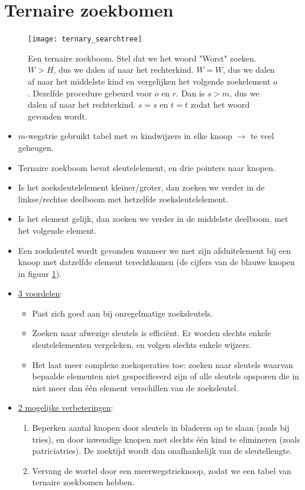 \documentclass{report}
\begin{document}
\section{Ternaire zoekbomen}
\begin{figure}
	\centering
	\texttt{[image: ternary\_searchtree]}
	\caption{Een ternaire zoekboom. Stel dat we het woord "Worst" zoeken. $W > H$, dus we dalen af naar het rechterkind. $W = W$, dus we dalen af naar het middelste kind en vergelijken het volgende zoekelement $o$. Dezelfde procedure gebeurd voor $o$ en $r$. Dan is $s > m$, dus we dalen af naar het rechterkind. $s = s$ en $t=t$ zodat het woord gevonden wordt.}
	\label{fig:ternary_searchtree}
\end{figure}
\begin{itemize}
	\item[\alert] $m$-wegstrie gebruikt tabel met $m$ kindwijzers in elke knoop $\rightarrow$ te veel geheugen.
	\item[\info] Ternaire zoekboom bevat sleutelelement, en drie pointers naar knopen.
	\item[\info] Is het zoeksleutelelement kleiner/groter, dan zoeken we verder in de linkse/rechtse deelboom met hetzelfde zoeksleutelelement.
	\item[\info] Is het element gelijk, dan zoeken we verder in de middelste deelboom, met het volgende element.
	\item[\info] Een zoeksleutel wordt gevonden wanneer we met zijn afsluitelement bij een knoop met datzelfde element terechtkomen (de cijfers van de blauwe knopen in figuur \ref{fig:ternary_searchtree}).
	\item[\info] \underline{3 voordelen}:
	\begin{itemize}
		\item[\good] Past zich goed aan bij onregelmatige zoeksleutels.
		\item[\good] Zoeken naar afwezige sleutels is efficiënt. Er worden slechts enkele sleutelelementen vergeleken, en volgen slechts enkele wijzers.
		\item[\good] Het laat meer complexe zoekoperaties toe: zoeken naar sleutels waarvan bepaalde elementen niet gespecificeerd zijn of alle sleutels opsporen die in niet meer dan één element verschillen van de zoeksleutel.
	\end{itemize}
	\item[\info] \underline{2 mogelijke verbeteringen}:
	\begin{enumerate}
		\item Beperken aantal knopen door sleutels in bladeren op te slaan (zoals bij tries), en door inwendige knopen met slechts één kind te elimineren (zoals patriciatries).  De zoektijd wordt dan onafhankelijk van de sleutellengte.
		\item Vervang de wortel door een meerwegstrieknoop, zodat we een tabel van ternaire zoekbomen hebben.
	\end{enumerate}
\end{itemize}
\end{document}
